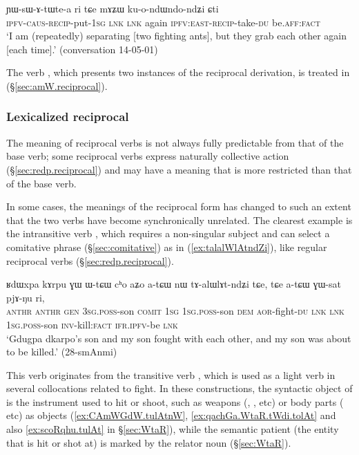 \begin{exe}
\ex \label{ex:YWsAtWtea}
\gll ɲɯ-sɯ-ɤ-tɯ\redp{}te-a ri tɕe mɤʑɯ ku-o-ndɯ\redp{}ndo-ndʑi ɕti \\
\textsc{ipfv}-\textsc{caus}-\textsc{recip}-put-\textsc{1sg} \textsc{lnk} \textsc{lnk} again \textsc{ipfv}:\textsc{east}-\textsc{recip}-take-\textsc{du} be.\textsc{aff}:\textsc{fact} \\
\glt `I am (repeatedly) separating [two fighting ants], but they grab each other again [each time].' (conversation 14-05-01)
\end{exe}

The verb , which presents two instances of the reciprocal derivation, is treated in (§\ref{sec:amW.reciprocal}).
 
\subsubsection{Lexicalized reciprocal} \label{sec:redp.lexicalized}
The meaning of reciprocal verbs is not always fully predictable from that of the base verb; some reciprocal verbs express naturally collective action (§\ref{sec:redp.reciprocal}) and may have a meaning that is more restricted than that of the base verb.

In some cases, the meanings of the reciprocal form has changed to such an extent that the two verbs have become synchronically unrelated. The clearest example is the intransitive verb , which requires a non-singular subject and can select a comitative phrase (§\ref{sec:comitative}) as in (\ref{ex:talalWlAtndZi}), like regular reciprocal verbs (§\ref{sec:redp.reciprocal}). 

\begin{exe}
\ex \label{ex:talalWlAtndZi}
\gll ʁdɯxpa kɤrpu ɣɯ ɯ-tɕɯ cʰo aʑo a-tɕɯ nɯ tɤ-alɯlɤt-ndʑi tɕe, tɕe a-tɕɯ ɣɯ-sat pjɤ-ŋu ri, \\
\textsc{anthr}  \textsc{anthr} \textsc{gen} \textsc{3sg}.\textsc{poss}-son \textsc{comit} \textsc{1sg} \textsc{1sg}.\textsc{poss}-son \textsc{dem} \textsc{aor}-fight-\textsc{du}  \textsc{lnk} \textsc{lnk} \textsc{1sg}.\textsc{poss}-son \textsc{inv}-kill:\textsc{fact} \textsc{ifr}.\textsc{ipfv}-be \textsc{lnk} \\
\glt `Gdugpa dkarpo's son and my son fought with each other, and my son was about to be killed.' (28-smAnmi)
\end{exe}

This verb originates from the transitive verb , which is used as a light verb in several collocations related to fight. In these constructions, the syntactic object of  is the instrument used to hit or shoot, such as weapons (, ,  etc) or body parts ( etc) as objects (\ref{ex:CAmWGdW.tulAtnW}, \ref{ex:qachGa.WtaR.tWdi.tolAt} and also \ref{ex:scoRqhu.tulAt} in §\ref{sec:WtaR}), while the semantic patient (the entity that is hit or shot at) is marked by the relator noun  (§\ref{sec:WtaR}).


